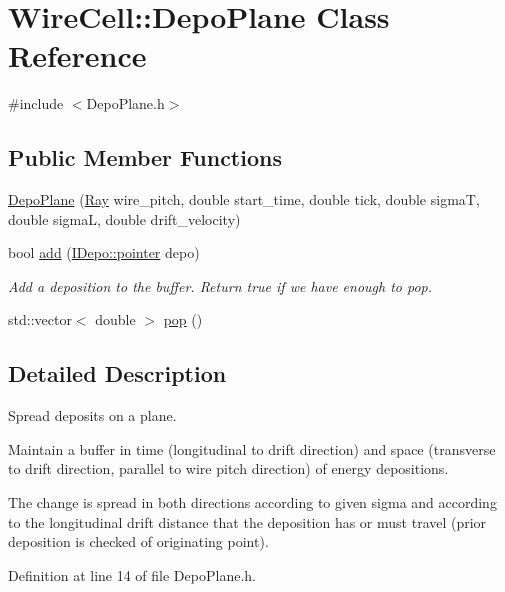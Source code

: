 \hypertarget{class_wire_cell_1_1_depo_plane}{}\section{Wire\+Cell\+:\+:Depo\+Plane Class Reference}
\label{class_wire_cell_1_1_depo_plane}


{\ttfamily \#include $<$Depo\+Plane.\+h$>$}

\subsection*{Public Member Functions}
\begin{DoxyCompactItemize}
\item 
\hyperlink{class_wire_cell_1_1_depo_plane_a4d0ce33e64a212ad9f77e5d995b4d7c8}{Depo\+Plane} (\hyperlink{namespace_wire_cell_a3ab20d9b438feb7eb1ffaab9ba98af0c}{Ray} wire\+\_\+pitch, double start\+\_\+time, double tick, double sigmaT, double sigmaL, double drift\+\_\+velocity)
\item 
bool \hyperlink{class_wire_cell_1_1_depo_plane_adbcc6a073be3c7b686d79cab4eb98408}{add} (\hyperlink{class_wire_cell_1_1_i_data_aff870b3ae8333cf9265941eef62498bc}{I\+Depo\+::pointer} depo)
\begin{DoxyCompactList}\small\item\em Add a deposition to the buffer. Return true if we have enough to pop. \end{DoxyCompactList}\item 
std\+::vector$<$ double $>$ \hyperlink{class_wire_cell_1_1_depo_plane_a9b25723a24fe7c59c1be3bae8e3497fa}{pop} ()
\end{DoxyCompactItemize}


\subsection{Detailed Description}
Spread deposits on a plane.

Maintain a buffer in time (longitudinal to drift direction) and space (transverse to drift direction, parallel to wire pitch direction) of energy depositions.

The change is spread in both directions according to given sigma and according to the longitudinal drift distance that the deposition has or must travel (prior deposition is checked of originating point). 

Definition at line 14 of file Depo\+Plane.\+h.



